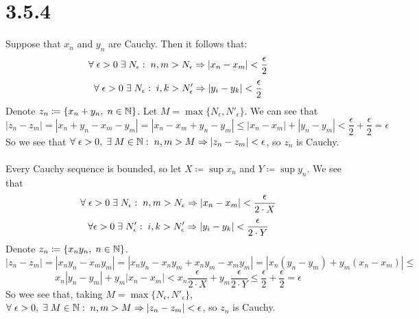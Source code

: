 \documentclass[11pt]{article}
\begin{document}
\section*{3.5.4}
Suppose that $x_n$ and $y_n$ are Cauchy. Then it follows that:
\[\forall \hspace{1mm} \epsilon > 0 \hspace{1mm} \exists \hspace{1mm} N_{\epsilon} : \hspace{1mm} n,m > N_{\epsilon} \Rightarrow |x_n-x_m| < \frac{\epsilon}{2}\]
\[\forall \hspace{1mm} \epsilon > 0 \hspace{1mm} \exists \hspace{1mm} N_{\epsilon} : \hspace{1mm} i,k > N'_{\epsilon} \Rightarrow|y_i - y_k| < \frac{\epsilon}{2}\]
Denote $z_n \coloneqq \{x_n + y_n, \hspace{1mm} n\in\mathbb{N}\}$. Let $M=\max\{N_{\epsilon}, N'_{\epsilon}\}$. We can see that
\[|z_n - z_m| = |x_n+y_n-x_m-y_m| = |x_n-x_m+y_n-y_m| \leq |x_n-x_m| + |y_n-y_m| < \frac{\epsilon}{2} + \frac{\epsilon}{2} = \epsilon\]
So we see that $\forall \hspace{1mm} \epsilon > 0, \hspace{1mm} \exists \hspace{1mm} M \in \mathbb{N}: \hspace{1mm} n,m > M \Rightarrow |z_n-z_m| < \epsilon$, so $z_n$ is Cauchy. \\
\\
Every Cauchy sequence is bounded, so let $X \coloneqq \sup{x_n}$ and $Y\coloneqq \sup{y_n}$. We see that 
\[\forall\hspace{1mm}\epsilon > 0 \hspace{1mm} \exists \hspace{1mm} N_{\epsilon}: \hspace{1mm} n,m>N_{\epsilon} \Rightarrow |x_n-x_m| < \frac{\epsilon}{2\cdot X}\]
\[\forall \epsilon > 0 \hspace{1mm} \exists \hspace{1mm} N'_{\epsilon}: \hspace{1mm} i,k>N'_{\epsilon} \Rightarrow |y_i-y_k|< \frac{\epsilon}{2 \cdot Y}\]
Denote $z_n \coloneqq \{x_ny_n, \hspace{1mm} n\in\mathbb{N}\}$.
\[|z_n-z_m|=|x_ny_n-x_my_m|=|x_ny_n-x_ny_m+x_ny_m-x_my_m|=|x_n(y_n-y_m)+y_m(x_n-x_m)| \leq\]
\[x_n|y_n-y_m|+y_m|x_n-x_m|  < x_n\frac{\epsilon}{2\cdot X} + y_m\frac{\epsilon}{2\cdot Y} \leq \frac{\epsilon}{2}+\frac{\epsilon}{2}=\epsilon\]
So wee see that, taking $M=\max\{N_{\epsilon}, N'_{\epsilon}\}$, $\forall \hspace{1mm} \epsilon > 0, \hspace{1mm} \exists \hspace{1mm} M \in\mathbb{N}: \hspace{1mm} n,m > M \Rightarrow |z_n-z_m| < \epsilon$, so $z_n$ is Cauchy.
\end{document}
